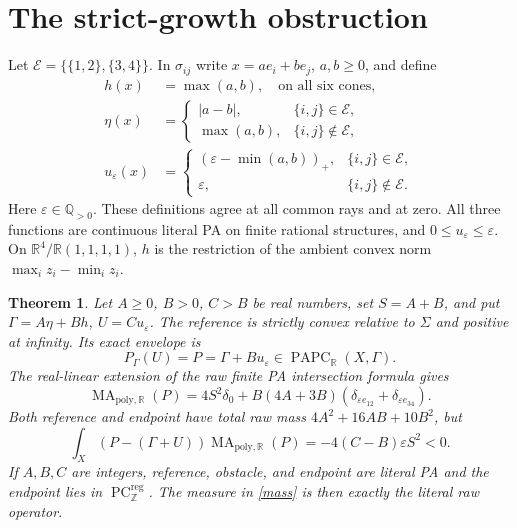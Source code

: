 \documentclass[11pt]{article}
\newtheorem{theorem}{Theorem}
\newcommand{\R}{\mathbb R}
\newcommand{\Z}{\mathbb Z}
\newcommand{\Q}{\mathbb Q}
\newcommand{\MARpoly}{\operatorname{MA}_{\mathrm{poly},\R}}
\newcommand{\PC}{\operatorname{PC}}
\newcommand{\PAPC}{\operatorname{PAPC}}
\newcommand{\reg}{\mathrm{reg}}
\newcommand{\eps}{\varepsilon}
\begin{document}
\section{The strict-growth obstruction}
Let $\mathcal E=\{\{1,2\},\{3,4\}\}$. In $\sigma_{ij}$ write $x=a e_i+b e_j$, $a,b\geq0$, and define
\begin{align*}
 h(x)&=\max(a,b),\quad\text{on all six cones},\\
 \eta(x)&=\begin{cases}|a-b|,&\{i,j\}\in\mathcal E,\\\max(a,b),&\{i,j\}\notin\mathcal E,\end{cases}\\
 u_\eps(x)&=\begin{cases}(\eps-\min(a,b))_+,&\{i,j\}\in\mathcal E,\\\eps,&\{i,j\}\notin\mathcal E.\end{cases}
\end{align*}
Here $\eps\in\Q_{>0}$. These definitions agree at all common rays and at zero. All three functions are continuous literal PA on finite rational structures, and $0\leq u_\eps\leq\eps$. On $\R^4/\R(1,1,1,1)$, $h$ is the restriction of the ambient convex norm $\max_i z_i-\min_i z_i$.

\begin{theorem}\label{main}
Let $A\geq0$, $B>0$, $C>B$ be real numbers, set $S=A+B$, and put $\Gamma=A\eta+B h$, $U=C u_\eps$. The reference is strictly convex relative to $\Sigma$ and positive at infinity. Its exact envelope is
\begin{equation}\label{Pformula}P_\Gamma(U)=P=\Gamma+B u_\eps\in\PAPC_{\R}(X,\Gamma).\end{equation}
The real-linear extension of the raw finite PA intersection formula gives
\begin{equation}\label{mass}
 \MARpoly(P)=4S^2\delta_0+B(4A+3B)(\delta_{\eps e_{12}}+\delta_{\eps e_{34}}).
\end{equation}
Both reference and endpoint have total raw mass $4A^2+16AB+10B^2$, but
\begin{equation}\label{contact}
 \int_X(P-(\Gamma+U))\MARpoly(P)=-4(C-B)\eps S^2<0.
\end{equation}
If $A,B,C$ are integers, reference, obstacle, and endpoint are literal PA and the endpoint lies in $\PC^{\reg}_{\Z}$. The measure in \eqref{mass} is then exactly the literal raw operator.
\end{theorem}
\end{document}
